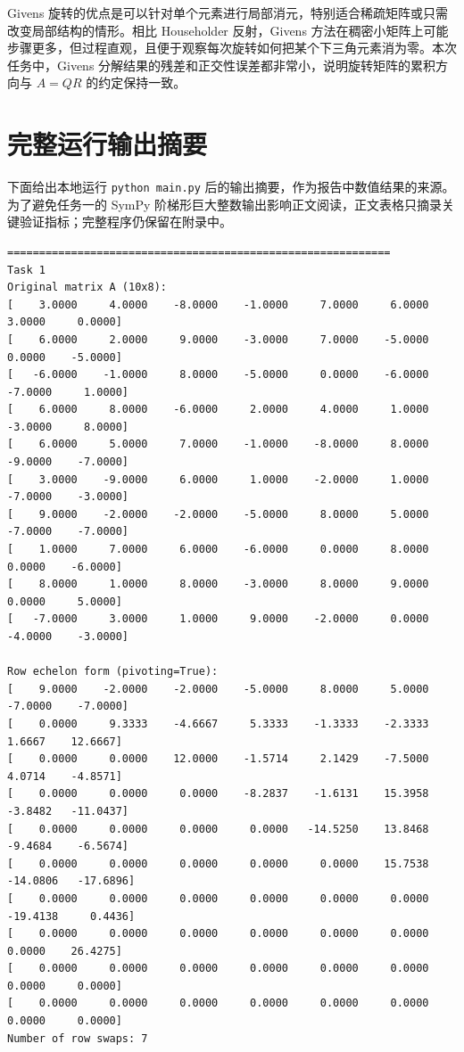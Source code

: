 \documentclass[UTF8,zihao=-4]{ctexart}
\begin{document}
Givens 旋转的优点是可以针对单个元素进行局部消元，特别适合稀疏矩阵或只需改变局部结构的情形。相比 Householder 反射，Givens 方法在稠密小矩阵上可能步骤更多，但过程直观，且便于观察每次旋转如何把某个下三角元素消为零。本次任务中，Givens 分解结果的残差和正交性误差都非常小，说明旋转矩阵的累积方向与 $A=QR$ 的约定保持一致。

\section{完整运行输出摘要}

下面给出本地运行 \texttt{python main.py} 后的输出摘要，作为报告中数值结果的来源。为了避免任务一的 SymPy 阶梯形巨大整数输出影响正文阅读，正文表格只摘录关键验证指标；完整程序仍保留在附录中。

\begin{lstlisting}[style=outstyle,caption={main.py 运行输出}]
============================================================
Task 1
Original matrix A (10x8):
[    3.0000     4.0000    -8.0000    -1.0000     7.0000     6.0000     3.0000     0.0000]
[    6.0000     2.0000     9.0000    -3.0000     7.0000    -5.0000     0.0000    -5.0000]
[   -6.0000    -1.0000     8.0000    -5.0000     0.0000    -6.0000    -7.0000     1.0000]
[    6.0000     8.0000    -6.0000     2.0000     4.0000     1.0000    -3.0000     8.0000]
[    6.0000     5.0000     7.0000    -1.0000    -8.0000     8.0000    -9.0000    -7.0000]
[    3.0000    -9.0000     6.0000     1.0000    -2.0000     1.0000    -7.0000    -3.0000]
[    9.0000    -2.0000    -2.0000    -5.0000     8.0000     5.0000    -7.0000    -7.0000]
[    1.0000     7.0000     6.0000    -6.0000     0.0000     8.0000     0.0000    -6.0000]
[    8.0000     1.0000     8.0000    -3.0000     8.0000     9.0000     0.0000     5.0000]
[   -7.0000     3.0000     1.0000     9.0000    -2.0000     0.0000    -4.0000    -3.0000]

Row echelon form (pivoting=True):
[    9.0000    -2.0000    -2.0000    -5.0000     8.0000     5.0000    -7.0000    -7.0000]
[    0.0000     9.3333    -4.6667     5.3333    -1.3333    -2.3333     1.6667    12.6667]
[    0.0000     0.0000    12.0000    -1.5714     2.1429    -7.5000     4.0714    -4.8571]
[    0.0000     0.0000     0.0000    -8.2837    -1.6131    15.3958    -3.8482   -11.0437]
[    0.0000     0.0000     0.0000     0.0000   -14.5250    13.8468    -9.4684    -6.5674]
[    0.0000     0.0000     0.0000     0.0000     0.0000    15.7538   -14.0806   -17.6896]
[    0.0000     0.0000     0.0000     0.0000     0.0000     0.0000   -19.4138     0.4436]
[    0.0000     0.0000     0.0000     0.0000     0.0000     0.0000     0.0000    26.4275]
[    0.0000     0.0000     0.0000     0.0000     0.0000     0.0000     0.0000     0.0000]
[    0.0000     0.0000     0.0000     0.0000     0.0000     0.0000     0.0000     0.0000]
Number of row swaps: 7


\end{lstlisting}
\end{document}
